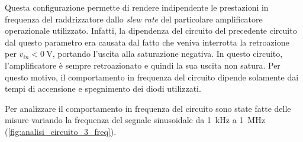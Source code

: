 \noindent
Questa configurazione permette di rendere indipendente le prestazioni in frequenza del raddrizzatore dallo \textit{slew rate} del particolare amplificatore operazionale utilizzato. Infatti, la dipendenza del circuito del precedente circuito dal questo parametro era causata dal fatto che veniva interrotta la retroazione per $v_{in}<\SI{0}{\volt}$, portando l'uscita alla saturazione negativa. In questo circuito, l'amplificatore è sempre retroazionato e quindi la sua uscita non satura. Per questo motivo, il comportamento in frequenza del circuito dipende solamente dai tempi di accensione e spegnimento dei diodi utilizzati. 

\noindent
Per analizzare il comportamento in frequenza del circuito sono state fatte delle misure variando la frequenza del segnale sinusoidale da \SI{1}{\kilo\hertz} a \SI{1}{\mega\hertz} (\Fig\ref{fig:analisi_circuito_3_freq}).
